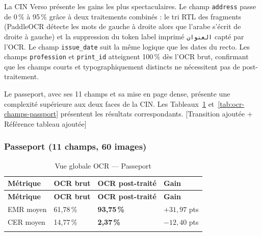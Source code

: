 \noindent La CIN Verso présente les gains les plus spectaculaires. Le champ \texttt{address} passe de 0\,\% à 95\,\% grâce à deux traitements combinés : le tri RTL des fragments (PaddleOCR détecte les mots de gauche à droite alors que l'arabe s'écrit de droite à gauche) et la suppression du token label imprimé \texttt{العنوان} capté par l'OCR. Le champ \texttt{issue\_date} suit la même logique que les dates du recto. Les champs \texttt{profession} et \texttt{print\_id} atteignent 100\,\% dès l'OCR brut, confirmant que les champs courts et typographiquement distincts ne nécessitent pas de post-traitement.

\medskip

Le passeport, avec ses 11 champs et sa mise en page dense, présente une complexité supérieure aux deux faces de la CIN. Les Tableaux~\ref{tab:ocr-global-passport} et~\ref{tab:ocr-champs-passport} présentent les résultats correspondants. [Transition ajoutée + Référence tableau ajoutée]

\subsubsection{Passeport (11 champs, 60 images)}

\renewcommand{\arraystretch}{1.35}
\setlength{\LTleft}{0pt plus 1fill}
\setlength{\LTright}{0pt plus 1fill}
\begin{longtable}{|p{3cm}|p{3.5cm}|p{4cm}|p{3.5cm}|}
  \hline
  \rowcolor{bleu_principal!15}
  \textbf{Métrique} & \textbf{OCR brut} & \textbf{OCR post-traité} & \textbf{Gain} \\
  \hline
  \endfirsthead
  \hline
  \rowcolor{bleu_principal!15}
  \textbf{Métrique} & \textbf{OCR brut} & \textbf{OCR post-traité} & \textbf{Gain} \\
  \hline
  \endhead
  EMR moyen & 61,78\,\% & \textbf{93,75\,\%} & $+31{,}97$ pts \\
  \hline
  CER moyen & 14,77\,\% & \textbf{2,37\,\%}  & $-12{,}40$ pts \\
  \hline
  \caption{Vue globale OCR --- Passeport}
  \label{tab:ocr-global-passport}
\end{longtable}

